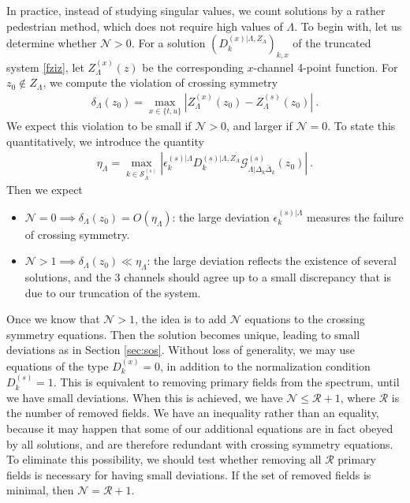 \documentclass[12pt, a4paper]{article}
\begin{document}
In practice, instead of studying singular values, we count solutions by a rather pedestrian method, which does not require high values of $\Lambda$. To begin with, let us determine whether $\mathcal{N}>0$. For a solution $\left(D_k^{(x)|\Lambda,Z_\Lambda}\right)_{k,x}$ of the truncated system \eqref{fziz}, let $Z^{(x)}_\Lambda(z)$ be the corresponding $x$-channel 4-point function. For $z_0\notin Z_\Lambda$, we compute the violation of crossing symmetry 
\begin{align}
 \delta_\Lambda(z_0) = \max_{x\in\{t,u\}} \left|Z^{(x)}_\Lambda(z_0)-Z^{(s)}_\Lambda(z_0)\right|\ . 
\end{align}
We expect this violation to be small if $\mathcal{N}>0$, and larger if $\mathcal{N}=0$. To state this  quantitatively, we introduce the quantity 
\begin{align}
 \eta_\Lambda = \max_{k\in \mathcal{S}_\Lambda^{(s)}} \left|\epsilon_k^{(s)|\Lambda} D_k^{(s)|\Lambda,Z_\Lambda}\mathcal{G}^{(s)}_{\Lambda|\Delta_k\bar\Delta_k}(z_0)\right| \ .
\end{align}
Then we expect
\begin{itemize}
 \item $\mathcal{N}=0\implies \delta_\Lambda(z_0) = O(\eta_\Lambda)$: the large deviation $\epsilon_k^{(s)|\Lambda}$ measures the failure of crossing symmetry.
 \item $\mathcal{N}>1\implies \delta_\Lambda(z_0) \ll \eta_\Lambda$: the large deviation reflects the existence of several solutions, and the 3 channels should agree up to a small discrepancy that is due to our truncation of the system. 
\end{itemize}
Once we know that $\mathcal{N}>1$, the idea is to add $\mathcal{N}$ equations to the crossing symmetry equations. Then the solution becomes unique, leading to small deviations as in Section \ref{sec:sos}. Without loss of generality, we may use equations of the type $D^{(x)}_k=0$, in addition to the normalization condition $D^{(s)}_k=1$. This is equivalent to removing primary fields from the spectrum, until we have small deviations. When this is achieved, we have $\mathcal{N}\leq \mathcal{R}+1$, where $\mathcal{R}$ is the number of removed fields. We have an inequality rather than an equality, because it may happen that some of our additional equations are in fact obeyed by all solutions, and are therefore redundant with crossing symmetry equations. To eliminate this possibility, we should test whether removing all $\mathcal{R}$ primary fields is necessary for having small deviations. If the set of removed fields is minimal, then $\mathcal{N}= \mathcal{R}+1$.
\end{document}
